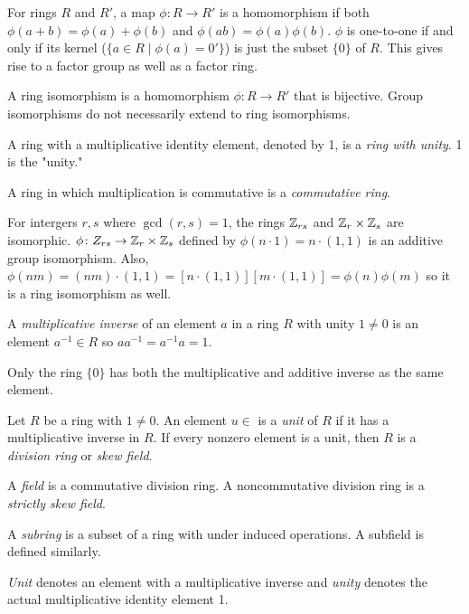 \begin{definition}
    For rings $R$ and $R'$, a map $\phi\colon R\to R'$ is a homomorphism if both $\phi(a+b) = \phi(a)+\phi(b)$ and $\phi(ab) = \phi(a)\phi(b)$. $\phi$ is one-to-one if and only if its kernel ($\{a \in R\mid \phi(a) = 0'\}$) is just the subset $\{0\}$ of $R$. This gives rise to a factor group as well as a factor ring.
\end{definition}
\begin{definition}
    A ring isomorphism is a homomorphism $\phi\colon R\to R'$ that is bijective. Group isomorphisms do not necessarily extend to ring isomorphisms.
\end{definition}
\begin{definition}[Unity]
  A ring with a multiplicative identity element, denoted by 1, is a \emph{ring with unity}. 1 is the "unity."
\end{definition}
\begin{definition}
    A ring in which multiplication is commutative is a \emph{commutative ring}.
\end{definition}
\begin{example}
    For intergers $r, s$ where $\gcd(r,s) = 1$, the rings $\mathbb{Z}_{rs}$ and $\mathbb{Z}_r\times\mathbb{Z}_s$ are isomorphic. $\phi\colon Z_{rs}\to \mathbb{Z}_r \times \mathbb{Z}_s$ defined by $\phi(n\cdot1)=n\cdot(1,1)$ is an additive group isomorphism. Also, $\phi(nm)=(nm)\cdot(1,1)=[n\cdot(1,1)][m\cdot(1,1)]=\phi(n)\phi(m)$ so it is a ring isomorphism as well.
\end{example}
\begin{definition}
    A \emph{multiplicative inverse} of an element $a$ in a ring $R$ with unity $1 \neq 0$ is an element $a^{-1} \in R$ so $aa^{-1}=a^{-1}a=1$.
\end{definition}
\begin{remark}
    Only the ring $\{0\}$ has both the multiplicative and additive inverse as the same element.
\end{remark}
\begin{definition}
    Let $R$ be a ring with $1 \neq 0$. An element $u \in $ is a \emph{unit} of $R$ if it has a multiplicative inverse in $R$. If every nonzero element is a unit, then $R$ is a \emph{division ring} or \emph{skew field}. 
\end{definition}
\begin{definition}[Field]
    A \emph{field} is a commutative division ring. A noncommutative division ring is a \emph{strictly skew field}.
\end{definition}
\begin{definition}
    A \emph{subring} is a subset of a ring with under induced operations. A subfield is defined similarly. 
\end{definition}
\begin{note}
    \emph{Unit} denotes an element with a multiplicative inverse and \emph{unity} denotes the actual multiplicative identity element 1.
\end{note}

